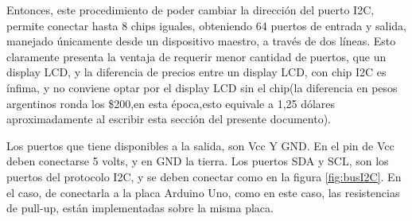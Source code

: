 Entonces, este procedimiento de poder cambiar la dirección del puerto I2C, permite conectar hasta 8 chips iguales, obteniendo 64 puertos de entrada y salida, manejado únicamente desde un dispositivo maestro, a través de dos líneas. Esto claramente presenta la ventaja de requerir menor cantidad de puertos, que un display LCD, y la diferencia de precios entre un display LCD, con chip I2C es ínfima, y no conviene optar por el display LCD sin el chip(la diferencia en pesos argentinos ronda los \$200,en esta época,esto equivale a 1,25 dólares aproximadamente al escribir esta sección del presente documento). 

Los puertos que tiene disponibles a la salida, son Vcc Y GND. En el pin de Vcc deben conectarse 5 volts, y en GND la tierra. Los puertos SDA y SCL, son los puertos del protocolo I2C, y se deben conectar como en la figura \ref{fig:busI2C}. En el caso, de conectarla a la placa Arduino Uno, como en este caso, las resistencias de pull-up, están implementadas sobre la misma placa. 
